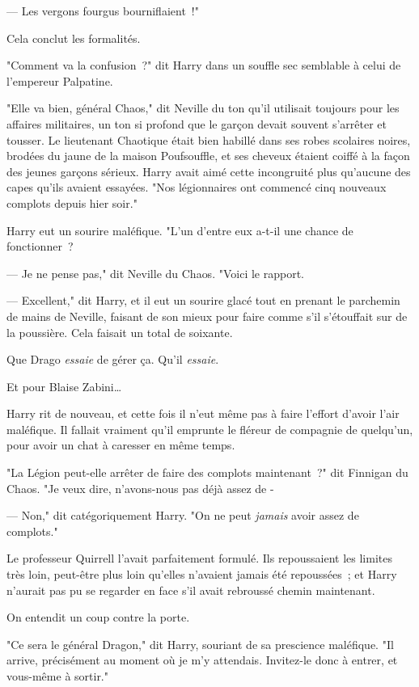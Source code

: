 --- Les vergons fourgus bourniflaient~!"

Cela conclut les formalités.

"Comment va la confusion~?" dit Harry dans un souffle sec semblable à celui de l'empereur Palpatine.

"Elle va bien, général Chaos," dit Neville du ton qu'il utilisait toujours pour les affaires militaires, un ton si profond que le garçon devait souvent s'arrêter et tousser. Le lieutenant Chaotique était bien habillé dans ses robes scolaires noires, brodées du jaune de la maison Poufsouffle, et ses cheveux étaient coiffé à la façon des jeunes garçons sérieux. Harry avait aimé cette incongruité plus qu'aucune des capes qu'ils avaient essayées. "Nos légionnaires ont commencé cinq nouveaux complots depuis hier soir."

Harry eut un sourire maléfique. "L'un d'entre eux a-t-il une chance de fonctionner~?

--- Je ne pense pas," dit Neville du Chaos. "Voici le rapport.

--- Excellent," dit Harry, et il eut un sourire glacé tout en prenant le parchemin de mains de Neville, faisant de son mieux pour faire comme s'il s'étouffait sur de la poussière. Cela faisait un total de soixante.

Que Drago \emph{essaie} de gérer ça. Qu'il \emph{essaie}.

Et pour Blaise Zabini…

Harry rit de nouveau, et cette fois il n'eut même pas à faire l'effort d'avoir l'air maléfique. Il fallait vraiment qu'il emprunte le fléreur de compagnie de quelqu'un, pour avoir un chat à caresser en même temps.

"La Légion peut-elle arrêter de faire des complots maintenant~?" dit Finnigan du Chaos. "Je veux dire, n'avons-nous pas déjà assez de -

--- Non," dit catégoriquement Harry. "On ne peut \emph{jamais} avoir assez de complots."

Le professeur Quirrell l'avait parfaitement formulé. Ils repoussaient les limites très loin, peut-être plus loin qu'elles n'avaient jamais été repoussées~; et Harry n'aurait pas pu se regarder en face s'il avait rebroussé chemin maintenant.

On entendit un coup contre la porte.

"Ce sera le général Dragon," dit Harry, souriant de sa prescience maléfique. "Il arrive, précisément au moment où je m'y attendais. Invitez-le donc à entrer, et vous-même à sortir."

